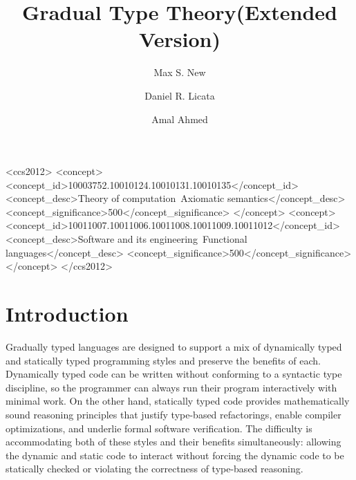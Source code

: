 \documentclass[acmsmall,screen,12pt]{acmart}
\title{Gradual Type Theory\iflong (Extended Version)\fi}
\author{Max S. New}
\affiliation{
  \institution{Northeastern University}            %
}
\author{Daniel R. Licata}
\affiliation{
  \institution{Wesleyan University}            %
}
\author{Amal Ahmed}
\affiliation{
  \institution{Northeastern University and Inria Paris}            %
}
\begin{document}
\begin{abstract}

\end{abstract}

 \begin{CCSXML}
<ccs2012>
<concept>
<concept_id>10003752.10010124.10010131.10010135</concept_id>
<concept_desc>Theory of computation~Axiomatic semantics</concept_desc>
<concept_significance>500</concept_significance>
</concept>
<concept>
<concept_id>10011007.10011006.10011008.10011009.10011012</concept_id>
<concept_desc>Software and its engineering~Functional languages</concept_desc>
<concept_significance>500</concept_significance>
</concept>
</ccs2012>
\end{CCSXML}





\maketitle

\section{Introduction}

Gradually typed languages are designed to support a mix of dynamically
typed and statically typed programming styles and preserve the
benefits of each.
%
Dynamically typed code can be written without conforming to a
syntactic type discipline, so the programmer can always run their
program interactively with minimal work.
%
On the other hand, statically typed code provides mathematically
sound reasoning principles that justify type-based refactorings,
enable compiler optimizations, and underlie formal software verification.
%
The difficulty is accommodating both of these styles and their benefits simultaneously:
allowing the dynamic and static code to interact without forcing the
dynamic code to be statically checked or violating the correctness of
type-based reasoning.
\end{document}
